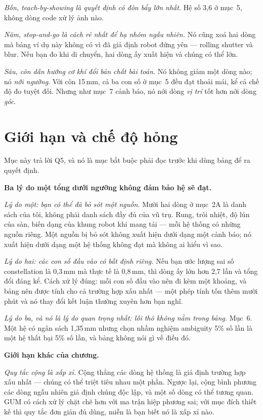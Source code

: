 \documentclass[../../marker.tex]{subfiles}
\begin{document}
\emph{Bốn, teach-by-showing là quyết định có đòn bẩy lớn nhất.} Hệ số 3,6 ở mục~5, không dòng code xử lý ảnh nào.

\emph{Năm, stop-and-go là cách rẻ nhất để hạ nhóm ngẫu nhiên.} Nó cũng xoá hai dòng mà bảng ví dụ này không có vì đã giả định robot đứng yên --- rolling shutter và blur. Nếu bạn đo khi di chuyển, hai dòng ấy xuất hiện và chúng có thể lớn.

\emph{Sáu, côn dẫn hướng cơ khí đổi bản chất bài toán.} Nó không giảm một dòng nào; nó \emph{nới ngưỡng}. Với côn 15\,mm, cả ba con số ở mục~5 đều đạt thoải mái, kể cả chế độ đo tuyệt đối. Nhưng như  mục~7 cảnh báo, nó nới dòng \emph{vị trí} tốt hơn nới dòng \emph{góc}.

\section{Giới hạn và chế độ hỏng}

Mục này trả lời Q5, và nó là mục bắt buộc phải đọc trước khi dùng bảng để ra quyết định.

\textbf{Ba lý do một tổng dưới ngưỡng không đảm bảo hệ sẽ đạt.}

\emph{Lý do một: bạn có thể đã bỏ sót một nguồn.} Mười hai dòng ở mục~2A là danh sách của tôi, không phải danh sách đầy đủ của vũ trụ. Rung, trôi nhiệt, độ lún của sàn, biến dạng của khung robot khi mang tải --- mỗi hệ thống có những nguồn riêng. Một nguồn bị bỏ sót không xuất hiện dưới dạng một cảnh báo; nó xuất hiện dưới dạng một hệ thống không đạt mà không ai hiểu vì sao.

\emph{Lý do hai: các con số đầu vào có bất định riêng.} Nếu bạn ước lượng sai số constellation là 0,3\,mm mà thực tế là 0,8\,mm, thì dòng ấy lớn hơn 2,7 lần và tổng đổi đáng kể. Cách xử lý đúng: mỗi con số đầu vào nên đi kèm một khoảng, và bảng nên được tính cho cả trường hợp xấu nhất --- một phép tính tốn thêm mười phút và nó thay đổi kết luận thường xuyên hơn bạn nghĩ.

\emph{Lý do ba, và nó là lý do quan trọng nhất: lỗi thô không nằm trong bảng.} Mục~6. Một hệ có ngân sách 1,35\,mm nhưng chọn nhầm nghiệm ambiguity 5\% số lần là một hệ thất bại 5\% số lần, và bảng không nói gì về điều đó.

\textbf{Giới hạn khác của chương.}

\emph{Quy tắc cộng là xấp xỉ.} Cộng thẳng các dòng hệ thống là giả định trường hợp xấu nhất --- chúng có thể triệt tiêu nhau một phần. Ngược lại, cộng bình phương các dòng ngẫu nhiên giả định chúng độc lập, và một số dòng có thể tương quan. GUM \cite{jcgm2008gum} có cách xử lý chặt chẽ hơn với ma trận hiệp phương sai; với mục đích thiết kế thì quy tắc đơn giản đủ dùng, miễn là bạn biết nó là xấp xỉ nào.
\end{document}
